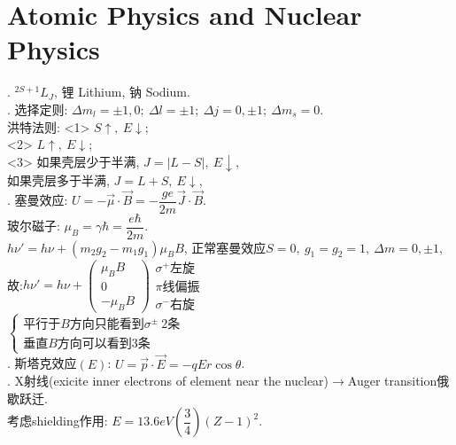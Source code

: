 \documentclass[12pt, 
]{article}
\begin{document}
\newpage

\section{Atomic Physics and Nuclear Physics}
. $^{2S+1}L_J$, 锂 Lithium, 钠 Sodium.
~\\

. 选择定则: $\Delta m_l=\pm 1, 0;~ \Delta l=\pm 1;~\Delta j=0,\pm1;~\Delta m_s=0$.
~\\\phantom{~~~~}洪特法则: <1> $S\uparrow,~E\downarrow$;
~\\\phantom{~~~~洪特法则:~}<2> $L\uparrow,~E\downarrow$;
~\\\phantom{~~~~洪特法则:~}<3> 如果壳层少于半满, $J=|L-S|,~E\downarrow$,
~\\\phantom{~~~~洪特法则:~<4>} 如果壳层多于半满, $J=L+S,~E\downarrow$,
~\\

. 塞曼效应: $U=-\vec{\mu}\cdot\vec{B}=-\dfrac{ge}{2m}\vec{J}\cdot\vec{B}$.
~\\\phantom{~~~~}玻尔磁子: $\mu_B=\gamma\hbar=\dfrac{e\hbar}{2m}$.
~\\\phantom{~~~~}$h\nu'=h\nu+(m_2g_2-m_1g_1)\mu_B B$, 正常塞曼效应$S=0,~g_1=g_2=1,~\Delta m=0,\pm1$,
~\\\phantom{~~~~}故:$h\nu'=h\nu+
\begin{pmatrix}
	\mu_B B\\0\\-\mu_BB
\end{pmatrix}
\begin{array}{l}
	\sigma^+\text{左旋}\\\pi\text{线偏振}\\\sigma^-\text{右旋}
\end{array}
$
~\\\phantom{~~~~}$
\left\{
\begin{array}{l}
	\text{平行于}B\text{方向只能看到}\sigma^\pm~2\text{条}\\
	\text{垂直}B\text{方向可以看到}3\text{条}
\end{array}\right.
$
~\\

. 斯塔克效应$(E)$: $U=\vec{p}\cdot\vec{E}=-qEr\cos\theta$.
~\\

. X射线(exicite inner electrons of element near the nuclear)$\rightarrow$Auger transition俄歇跃迁.
~\\\phantom{~~~~}考虑shielding作用: $E=13.6eV(\dfrac{3}{4})(Z-1)^2$.
~\\
\end{document}
